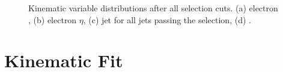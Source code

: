 \begin{figure}[!htp]
   \centering
   \hfill
   \caption{\label{fig:controlplots}Kinematic variable distributions after all selection cuts. (a) electron \pt, (b)
   electron $\eta$, (c) jet \pt for all jets passing the selection, (d) \MET.}
\end{figure}

\section{Kinematic Fit}
\label{s_top_mass:kinematic_fit}

